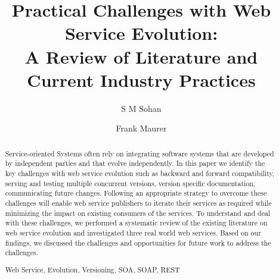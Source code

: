 \documentclass[runningheads,a4paper]{llncs}
\newcommand{\keywords}[1]{\par\addvspace\baselineskip
\noindent\keywordname\enspace\ignorespaces#1}
\begin{document}
\mainmatter  %

\title{Practical Challenges with Web Service Evolution:\\A Review of Literature and Current Industry Practices}


%
%
\author{S M Sohan%
\and Frank Maurer}
%


%
%

\maketitle


\begin{abstract}


Service-oriented Systems often rely on integrating software systems that are developed by independent parties and that evolve independently. In this paper we identify the key challenges with web service evolution such as backward and forward compatibility, serving and testing multiple concurrent versions, version specific documentation, communicating future changes. Following an appropriate strategy to overcome these challenges will enable web service publishers to iterate their services as required while minimizing the impact on existing consumers of the services. To understand and deal with these challenges, we performed a systematic review of the existing literature on web service evolution and investigated three real world web services. Based on our findings, we discussed the challenges and opportunities for future work to address the challenges.

\keywords{Web Service, Evolution, Versioning, SOA, SOAP, REST}
\end{abstract}
\end{document}
